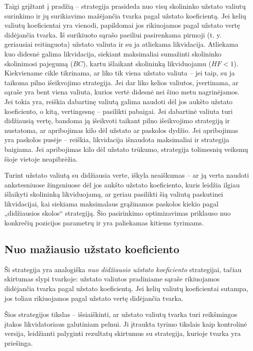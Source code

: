 \documentclass[]{VUMIFTemplateClass}
\begin{document}
Taigi grįžtant į pradžią – strategija prasideda nuo visų skolininko užstato valiutų surinkimo ir jų surikiavimo mažėjančia tvarka pagal užstato koeficientą. Jei kelių valiutų koeficientai yra vienodi, papildomai jos rikiuojamos pagal užstato vertę didėjančia tvarka. Iš surikiuoto sąrašo paeiliui pasirenkama pirmoji (t. y. geriausiai reitinguota) užstato valiuta ir su ja atliekama likvidacija. Atliekama kuo didesnė galima likvidacija, siekiant maksimaliai sumažinti skolininko skolinimosi pajegumą ($BC$), kartu išlaikant skolininką likviduojamu ($HF < 1$). Kiekviename cikle tikrinama, ar liko tik viena užstato valiuta – jei taip, su ja taikoma pilno išeikvojimo strategija. Jei dar liko kelios valiutos, įvertinama, ar sąraše yra bent viena valiuta, kurios vertė didesnė nei šiuo metu nagrinėjamos. Jei tokia yra, reiškia dabartinę valiutą galima naudoti dėl jos aukšto užstato koeficiento, o kitą, vertingesnę – pasilikti pabaigai. Jei dabartinė valiuta turi didžiausią vertę, bandoma ją išeikvoti taikant pilno išeikvojimo strategiją ir nustatoma, ar apribojimas kilo dėl užstato ar paskolos dydžio. Jei apribojimas yra paskolos pusėje – reiškia, likvidacija išnaudota maksimaliai ir strategija baigiama. Jei apribojimas kilo dėl užstato trūkumo, strategija tolimesnių veiksmų šioje vietoje neapibrėžia.

Turint užstato valiutą su didžiausia verte, iškyla neaiškumas – ar ją verta naudoti ankstesniuose žingsniuose dėl jos aukšto užstato koeficiento, kuris leidžia ilgiau išlaikyti skolininką likviduojamą, ar geriau pasilikti šią valiutą paskutinei likvidacijai, kai siekiama maksimalaus grąžinamos paskolos kiekio pagal „didžiausios skolos“ strategiją. Šio pasirinkimo optimizavimas priklauso nuo konkrečių pozicijos parametrų ir yra paliekamas kitiems tyrimams.

\subsection{Nuo mažiausio užstato koeficiento}
\label{sec:nuo_maziausio_ustato_koeficiento}

Ši strategija yra analogiška \textit{nuo didžiausio užstato koeficiento} strategijai, tačiau skirtumas slypi tvarkoje: užstato valiutos pradiniame sąraše rikiuojamos didėjančia tvarka pagal užstato koeficientą. Jei kelių valiutų koeficientai sutampa, jos toliau rikiuojamos pagal užstato vertę didėjančia tvarka.

Šios strategijos tikslas – išsiaiškinti, ar užstato valiutų tvarka turi reikšmingos įtakos likvidatoriaus galutiniam pelnui. Ji įtraukta tyrimo tikslais kaip kontrolinė versija, leidžianti palyginti rezultatų skirtumus su strategija, kurioje tvarka yra priešinga.
\end{document}
